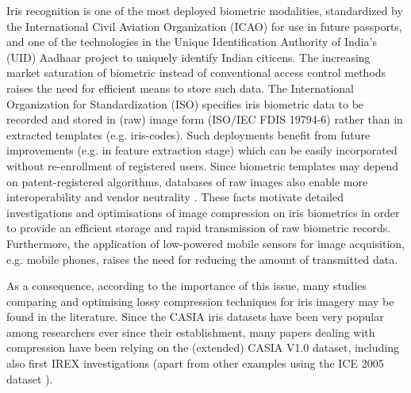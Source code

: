 \documentclass[10pt,twocolumn,letterpaper]{article}
\begin{document}
Iris recognition \cite{BBurge13a,Rathgeb12e} is one of the most deployed biometric
modalities, standardized by the International Civil Aviation
Organization (ICAO) for use in future passports, and one of
the technologies in the Unique Identification Authority of
India's (UID) Aadhaar project to uniquely identify Indian
citicens. The increasing market saturation of
biometric instead of conventional access control methods
raises the need for efficient means to store such data. The
International Organization for Standardization (ISO)
specifies iris biometric data to be recorded and stored in (raw)
image form (ISO/IEC FDIS 19794-6) rather than in extracted
templates (e.g. iris-codes). Such
deployments benefit from future improvements (e.g. in
feature extraction stage) which can be easily incorporated
without re-enrollment of registered users. Since biometric templates may depend on patent-registered
algorithms, databases of raw images also enable more
interoperability and vendor neutrality \cite{Rathgeb12e}. These facts
motivate detailed investigations and optimisations of image
compression on iris biometrics in order to provide an efficient
storage and rapid transmission of raw biometric records.
Furthermore, the application of low-powered mobile sensors
for image acquisition, e.g. mobile phones, raises the need for
reducing the amount of transmitted data.


As a consequence, according to the importance of this issue, many studies comparing and optimising lossy compression techniques for iris imagery 
may be found in the literature. Since the CASIA iris datasets have been very popular among researchers ever since their establishment,
many papers dealing with compression have been relying on the (extended) CASIA V1.0 dataset, including also first IREX investigations 
\cite{BRakshit07a,BIves08a,Matschitsch07a,Haemmerle09a,Konrad09a} (apart from other examples using the ICE 2005 dataset 
\cite{BDaugman08a,BIves10a}).
	
\end{document}
